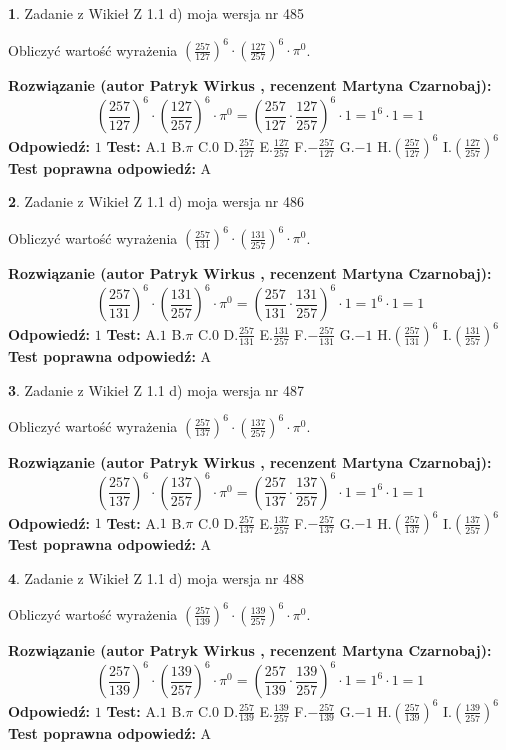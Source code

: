 \documentclass[12pt, a4paper]{article}
\theoremstyle{definition} %
\newtheorem{zad}{}
\newcommand{\zadStart}[1]{\begin{zad}#1\newline}
\newcommand{\zadStop}{\end{zad}}
\newcommand{\rozwStart}[2]{\noindent \textbf{Rozwiązanie (autor #1 , recenzent #2): }\newline}
\newcommand{\rozwStop}{\newline}
\newcommand{\odpStart}{\noindent \textbf{Odpowiedź:}\newline}
\newcommand{\odpStop}{\newline}
\newcommand{\testStart}{\noindent \textbf{Test:}\newline}
\newcommand{\testStop}{\newline}
\newcommand{\kluczStart}{\noindent \textbf{Test poprawna odpowiedź:}\newline}
\newcommand{\kluczStop}{\newline}
\begin{document}
\zadStart{Zadanie z Wikieł Z 1.1 d) moja wersja nr 485}

Obliczyć wartość wyrażenia $(\frac{257}{127})^{6} \cdot (\frac{127}{257})^{6} \cdot \pi^{0}$.
\zadStop
\rozwStart{Patryk Wirkus}{Martyna Czarnobaj}
$$(\frac{257}{127})^{6} \cdot (\frac{127}{257})^{6} \cdot \pi^{0} = (\frac{257}{127} \cdot \frac{127}{257})^{6} \cdot 1 = 1^{6} \cdot 1 = 1$$
\rozwStop
\odpStart
$1$
\odpStop
\testStart
A.$1$ B.$\pi$ C.$0$ D.$\frac{257}{127}$ E.$\frac{127}{257}$
F.$-\frac{257}{127}$ G.$-1$
H.$(\frac{257}{127})^{6}$
I.$(\frac{127}{257})^{6}$
\testStop
\kluczStart
A
\kluczStop



\zadStart{Zadanie z Wikieł Z 1.1 d) moja wersja nr 486}

Obliczyć wartość wyrażenia $(\frac{257}{131})^{6} \cdot (\frac{131}{257})^{6} \cdot \pi^{0}$.
\zadStop
\rozwStart{Patryk Wirkus}{Martyna Czarnobaj}
$$(\frac{257}{131})^{6} \cdot (\frac{131}{257})^{6} \cdot \pi^{0} = (\frac{257}{131} \cdot \frac{131}{257})^{6} \cdot 1 = 1^{6} \cdot 1 = 1$$
\rozwStop
\odpStart
$1$
\odpStop
\testStart
A.$1$ B.$\pi$ C.$0$ D.$\frac{257}{131}$ E.$\frac{131}{257}$
F.$-\frac{257}{131}$ G.$-1$
H.$(\frac{257}{131})^{6}$
I.$(\frac{131}{257})^{6}$
\testStop
\kluczStart
A
\kluczStop



\zadStart{Zadanie z Wikieł Z 1.1 d) moja wersja nr 487}

Obliczyć wartość wyrażenia $(\frac{257}{137})^{6} \cdot (\frac{137}{257})^{6} \cdot \pi^{0}$.
\zadStop
\rozwStart{Patryk Wirkus}{Martyna Czarnobaj}
$$(\frac{257}{137})^{6} \cdot (\frac{137}{257})^{6} \cdot \pi^{0} = (\frac{257}{137} \cdot \frac{137}{257})^{6} \cdot 1 = 1^{6} \cdot 1 = 1$$
\rozwStop
\odpStart
$1$
\odpStop
\testStart
A.$1$ B.$\pi$ C.$0$ D.$\frac{257}{137}$ E.$\frac{137}{257}$
F.$-\frac{257}{137}$ G.$-1$
H.$(\frac{257}{137})^{6}$
I.$(\frac{137}{257})^{6}$
\testStop
\kluczStart
A
\kluczStop



\zadStart{Zadanie z Wikieł Z 1.1 d) moja wersja nr 488}

Obliczyć wartość wyrażenia $(\frac{257}{139})^{6} \cdot (\frac{139}{257})^{6} \cdot \pi^{0}$.
\zadStop
\rozwStart{Patryk Wirkus}{Martyna Czarnobaj}
$$(\frac{257}{139})^{6} \cdot (\frac{139}{257})^{6} \cdot \pi^{0} = (\frac{257}{139} \cdot \frac{139}{257})^{6} \cdot 1 = 1^{6} \cdot 1 = 1$$
\rozwStop
\odpStart
$1$
\odpStop
\testStart
A.$1$ B.$\pi$ C.$0$ D.$\frac{257}{139}$ E.$\frac{139}{257}$
F.$-\frac{257}{139}$ G.$-1$
H.$(\frac{257}{139})^{6}$
I.$(\frac{139}{257})^{6}$
\testStop
\kluczStart
A
\kluczStop
\end{document}
